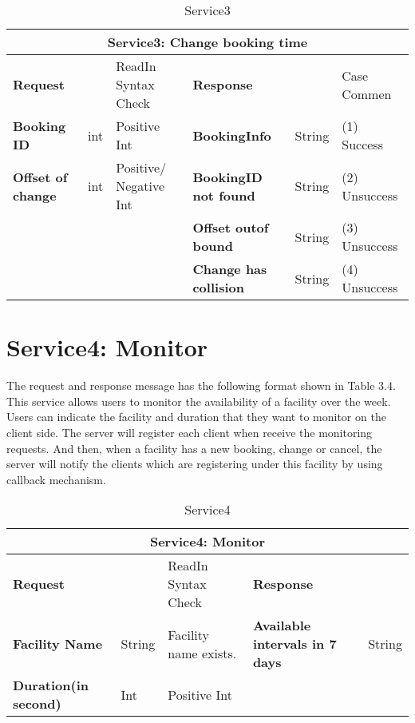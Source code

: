 \begin{spacing}{1}
\begin{table}[h!]
\centering
\begin{tabular}{|l|l|l|l|l|l|}
\hline
\multicolumn{6}{|c|}{Service3: Change booking time} \\ \hline
\textbf{Request} &  & ReadIn Syntax Check & \multicolumn{2}{l|}{\textbf{Response}} & Case Commen \\ \hline
\textbf{Booking ID} & int & Positive Int & \textbf{BookingInfo} & String & (1) Success \\ \hline
\textbf{Offset of change} & int & Positive/ Negative Int & \textbf{BookingID not found} & String & (2) Unsuccess \\ \hline
 &  &  & \textbf{Offset outof bound} & String & (3) Unsuccess \\ \hline
 &  &  & \textbf{Change has collision} & String & (4) Unsuccess \\ \hline
\end{tabular}
\caption{Service3}
\end{table}

\section{Service4: Monitor}
The request and response message has the following format shown in Table 3.4.\\
This service allows users to monitor the availability of a facility over the week. Users can indicate the facility and duration that they want to monitor on the client side. The server will register each client when receive the monitoring requests. And then, when a facility has a new booking, change or cancel, the server will notify the clients which are registering under this facility by using callback mechanism.

\begin{table}[h!]
\centering
\begin{tabular}{|l|l|l|l|l|}
\hline
\multicolumn{5}{|c|}{Service4: Monitor} \\ \hline
\multicolumn{2}{|l|}{\textbf{Request}} & ReadIn Syntax Check & \multicolumn{2}{l|}{\textbf{Response}} \\ \hline
\textbf{Facility Name} & String & Facility name exists. & \textbf{Available intervals in 7 days} & String \\ \hline
\textbf{Duration(in second)} & Int & Positive Int  &  & \\ \hline
\end{tabular}
\caption{Service4}
\end{table}


\end{spacing}
